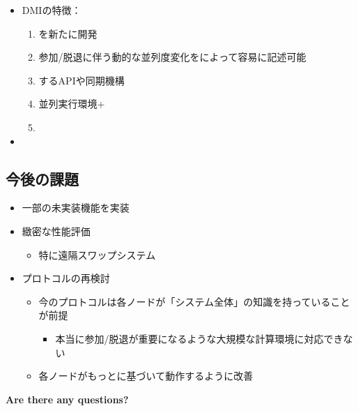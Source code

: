 \documentclass[25pt,landscape,papersize]{jsarticle}
\begin{document}
\begin{itemize}
\item DMIの特徴：
  \begin{enumerate}
  \item {}を新たに開発
  \item 参加/脱退に伴う動的な並列度変化をによって容易に記述可能
  \item {}するAPIや同期機構
  \item 並列実行環境$+$
  \item {}
  \end{enumerate}
\item {}
\end{itemize}

\subsection{今後の課題}

\begin{itemize}
\item 一部の未実装機能を実装
\item 緻密な性能評価
  \begin{itemize}
  \item 特に遠隔スワップシステム
  \end{itemize}
\item プロトコルの再検討
  \begin{itemize}
  \item 今のプロトコルは各ノードが「システム全体」の知識を持っていることが前提
    \begin{itemize}
    \item 本当に参加/脱退が重要になるような大規模な計算環境に対応できない
    \end{itemize}
  \item 各ノードがもっとに基づいて動作するように改善
  \end{itemize}
\end{itemize}

\thankyou

{\Huge\textbf{Are there any questions?}}
\end{document}

